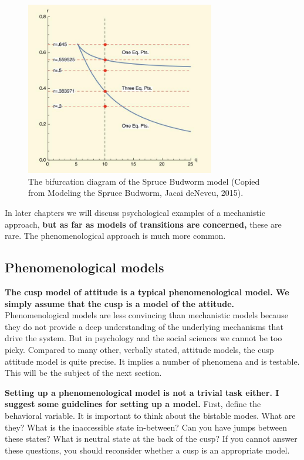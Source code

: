 \documentclass[
  letterpaper,
]{scrbook}
\begin{document}
\begin{figure}

{\centering \includegraphics[width=3.25314in,height=2.98131in]{media/ch3/image16.jpg}

}

\caption{\label{fig-ch3-img16-old-28}The bifurcation diagram of the
Spruce Budworm model (Copied from Modeling the Spruce Budworm, Jacai
deNeveu, 2015).}

\end{figure}

In later chapters we will discuss psychological examples of a
mechanistic approach, \textbf{but as far as models of transitions are
concerned,} these are rare. The phenomenological approach is much more
common.

\hypertarget{phenomenological-models}{%
\subsection{Phenomenological models}\label{phenomenological-models}}

\textbf{The cusp model of attitude is a typical phenomenological model.
We simply assume that the cusp is a model of the attitude.}
Phenomenological models are less convincing than mechanistic models
because they do not provide a deep understanding of the underlying
mechanisms that drive the system. But in psychology and the social
sciences we cannot be too picky. Compared to many other, verbally
stated, attitude models, the cusp attitude model is quite precise. It
implies a number of phenomena and is testable. This will be the subject
of the next section.

\textbf{Setting up a phenomenological model is not a trivial task
either. I suggest some guidelines for setting up a model.} First, define
the behavioral variable. It is important to think about the bistable
modes. What are they? What is the inaccessible state in-between? Can you
have jumps between these states? What is neutral state at the back of
the cusp? If you cannot answer these questions, you should reconsider
whether a cusp is an appropriate model.
\end{document}
